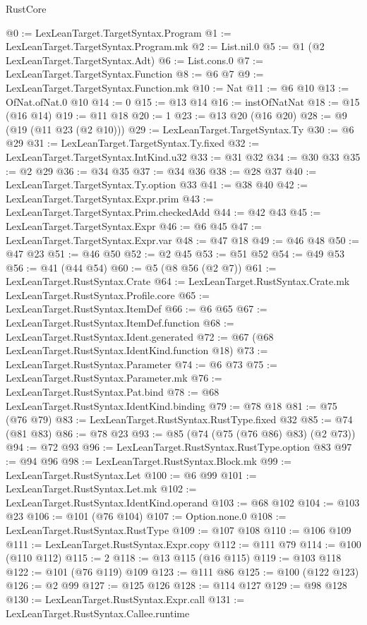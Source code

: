\begin{lexlean}{RustCore}
\begin{coremodule}
@0 := LexLeanTarget.TargetSyntax.Program
@1 := LexLeanTarget.TargetSyntax.Program.mk
@2 := List.nil.{0}
@5 := @1 (@2 LexLeanTarget.TargetSyntax.Adt)
@6 := List.cons.{0}
@7 := LexLeanTarget.TargetSyntax.Function
@8 := @6 @7
@9 := LexLeanTarget.TargetSyntax.Function.mk
@10 := Nat
@11 := @6 @10
@13 := OfNat.ofNat.{0} @10
@14 := 0
@15 := @13 @14
@16 := instOfNatNat
@18 := @15 (@16 @14)
@19 := @11 @18
@20 := 1
@23 := @13 @20 (@16 @20)
@28 := @9 (@19 (@11 @23 (@2 @10)))
@29 := LexLeanTarget.TargetSyntax.Ty
@30 := @6 @29
@31 := LexLeanTarget.TargetSyntax.Ty.fixed
@32 := LexLeanTarget.TargetSyntax.IntKind.u32
@33 := @31 @32
@34 := @30 @33
@35 := @2 @29
@36 := @34 @35
@37 := @34 @36
@38 := @28 @37
@40 := LexLeanTarget.TargetSyntax.Ty.option @33
@41 := @38 @40
@42 := LexLeanTarget.TargetSyntax.Expr.prim
@43 := LexLeanTarget.TargetSyntax.Prim.checkedAdd
@44 := @42 @43
@45 := LexLeanTarget.TargetSyntax.Expr
@46 := @6 @45
@47 := LexLeanTarget.TargetSyntax.Expr.var
@48 := @47 @18
@49 := @46 @48
@50 := @47 @23
@51 := @46 @50
@52 := @2 @45
@53 := @51 @52
@54 := @49 @53
@56 := @41 (@44 @54)
@60 := @5 (@8 @56 (@2 @7))
@61 := LexLeanTarget.RustSyntax.Crate
@64 := LexLeanTarget.RustSyntax.Crate.mk LexLeanTarget.RustSyntax.Profile.core
@65 := LexLeanTarget.RustSyntax.ItemDef
@66 := @6 @65
@67 := LexLeanTarget.RustSyntax.ItemDef.function
@68 := LexLeanTarget.RustSyntax.Ident.generated
@72 := @67 (@68 LexLeanTarget.RustSyntax.IdentKind.function @18)
@73 := LexLeanTarget.RustSyntax.Parameter
@74 := @6 @73
@75 := LexLeanTarget.RustSyntax.Parameter.mk
@76 := LexLeanTarget.RustSyntax.Pat.bind
@78 := @68 LexLeanTarget.RustSyntax.IdentKind.binding
@79 := @78 @18
@81 := @75 (@76 @79)
@83 := LexLeanTarget.RustSyntax.RustType.fixed @32
@85 := @74 (@81 @83)
@86 := @78 @23
@93 := @85 (@74 (@75 (@76 @86) @83) (@2 @73))
@94 := @72 @93
@96 := LexLeanTarget.RustSyntax.RustType.option @83
@97 := @94 @96
@98 := LexLeanTarget.RustSyntax.Block.mk
@99 := LexLeanTarget.RustSyntax.Let
@100 := @6 @99
@101 := LexLeanTarget.RustSyntax.Let.mk
@102 := LexLeanTarget.RustSyntax.IdentKind.operand
@103 := @68 @102
@104 := @103 @23
@106 := @101 (@76 @104)
@107 := Option.none.{0}
@108 := LexLeanTarget.RustSyntax.RustType
@109 := @107 @108
@110 := @106 @109
@111 := LexLeanTarget.RustSyntax.Expr.copy
@112 := @111 @79
@114 := @100 (@110 @112)
@115 := 2
@118 := @13 @115 (@16 @115)
@119 := @103 @118
@122 := @101 (@76 @119) @109
@123 := @111 @86
@125 := @100 (@122 @123)
@126 := @2 @99
@127 := @125 @126
@128 := @114 @127
@129 := @98 @128
@130 := LexLeanTarget.RustSyntax.Expr.call
@131 := LexLeanTarget.RustSyntax.Callee.runtime

\end{coremodule}
\end{lexlean}
